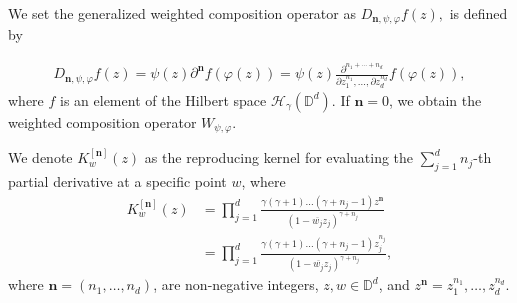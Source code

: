 \documentclass[12pt, reqno]{amsart}
\theoremstyle{definition}
\theoremstyle{remark}
\numberwithin{equation}{section}
\newcommand{\mfn}{\mathbf n}
\begin{document}
 
 
 
We set the generalized weighted composition operator as   $D_{\mfn,\psi,\varphi}f(z),$ is defined by

\begin{gather*}
D_{\mfn,\psi,\varphi}f(z)=\psi(z)\partial^{\mfn}f(\varphi(z))=\psi(z)\frac{\partial^{n_1+\cdots+n_d}}{\partial z_1^{n_1},\dots,\partial z_d^{n_d}}f(\varphi(z)),
\end{gather*}
where $f$ is an element of the Hilbert space $\mathcal{H}_\gamma(\mathbb{D}^d)$. If $\mfn =0$, we obtain the weighted composition operator $W_{\psi, \varphi}$.



 We denote $K_w^{[\mfn]}(z)$ as the reproducing kernel for evaluating the $\sum_{j=1}^{d}n_j$-th partial derivative at a specific point $w$, where
\begin{align*}
K_w^{[\mfn]}(z)&=\prod_{j=1}^d\frac{\gamma(\gamma+1)\dots(\gamma+n_j-1)z^\mfn}{(1-\overline{w_j}z_j)^{\gamma+n_j}}\\
& =\prod_{j=1}^d\frac{\gamma(\gamma+1)\dots(\gamma+n_j-1)z_j^{n_j}}{(1-\overline{w_j}z_j)^{\gamma+n_j}},
\end{align*}
where  $\mfn=(n_1, \dots, n_d)$, are non-negative integers, $z, w\in \mathbb{D}^d$, and $z^{\mfn}=z_1^{n_1},\dots, z_d^{n_d}.$
\end{document}
